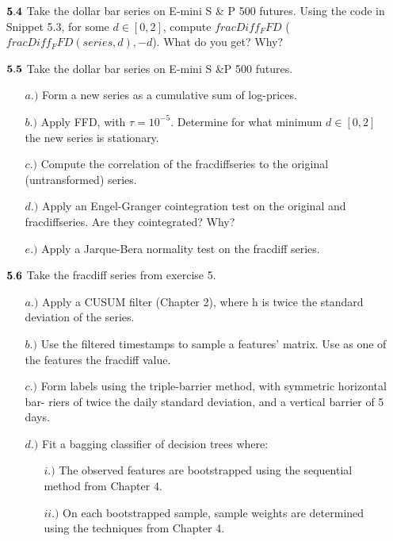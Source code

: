 \documentclass{letter}
\begin{document}
\begin{itemize}
\item[${\bf 5.4}$] Take the dollar bar series on E-mini S \& P 500 futures. Using the code
in Snippet 5.3, for some $d \in [0, 2]$, compute $fracDiff_FFD$ ($fracDiff
_FFD(series,d),-d$). What do you get? Why?

\item[${\bf 5.5}$] Take the dollar bar series on E-mini S \&P 500 futures.
\begin{itemize}
\item[$a.)$] Form a new series as a cumulative sum of log-prices.
\item[$b.)$] Apply FFD, with $\tau = 10^{-5}$. Determine for what 
minimum $d \in [0, 2]$ the new series is stationary.
\item[$c.)$] Compute the correlation of the fracdiffseries to the original (untransformed)
series.
\item[$d.)$] Apply an Engel-Granger cointegration test on the original and fracdiffseries.
Are they cointegrated? Why?
\item[$e.)$] Apply a Jarque-Bera normality test on the fracdiff series.
\end{itemize}

\item[${\bf 5.6}$] Take the fracdiff series from exercise 5.
\begin{itemize}
\item[$a.)$] Apply a CUSUM filter (Chapter 2), where h is twice the standard deviation
of the series.
\item[$b.)$] Use the filtered timestamps to sample a features’ matrix. Use as one of the
features the fracdiff value.
\item[$c.)$] Form labels using the triple-barrier method, with symmetric horizontal bar-
riers of twice the daily standard deviation, and a vertical barrier of 5 days.
\item[$d.)$] Fit a bagging classifier of decision trees where:
\begin{itemize}
\item[$i.)$] The observed features are bootstrapped using the 
sequential method from Chapter 4.
\item[$ii.)$] On each bootstrapped sample, sample weights are 
determined using the techniques from Chapter 4.
\end{itemize}
\end{itemize}
\end{itemize}
\end{document}
